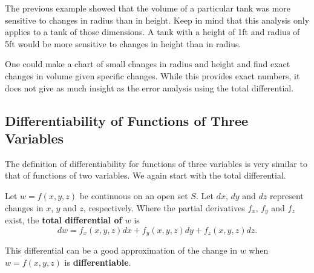 The previous example showed that the volume of a particular tank was more sensitive to changes in radius than in height. Keep in mind that this analysis only applies to a tank of those dimensions. A tank with a height of 1ft and radius of 5ft would be more sensitive to changes in height than in radius.

One could make a chart of small changes in radius and height and find exact changes in volume given specific changes. While this provides exact numbers, it does not give as much insight as the error analysis using the total differential.

\subsection{Differentiability of Functions of Three Variables}

The definition of differentiability for functions of three variables is very similar to that of functions of two variables. We again start with the total differential.

\begin{definition}\label{def:total_differential3}
Let $w=f(x,y,z)$ be continuous on an open set $S$. Let $dx$, $dy$ and $dz$ represent changes in $x$, $y$ and  $z$, respectively. Where the partial derivatives $f_x$, $f_y$ and $f_z$ exist, the \textbf{total differential of $w$} is
\[dw = f_x(x,y,z)dx + f_y(x,y,z)dy+f_z(x,y,z)dz.\]
\end{definition}

This differential can be a good approximation of the change in $w$ when $w = f(x,y,z)$ is \textbf{differentiable}.

